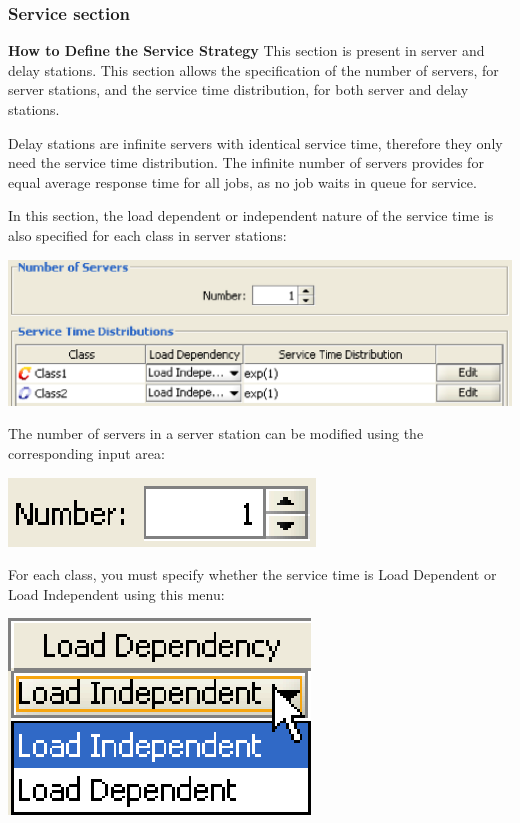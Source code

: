 \subsubsection{Service section}
\label{sec:ServiceSection}
\textbf{How to Define the Service Strategy}
This section is present in server and delay stations. 
This section allows the specification of the number of servers, for server stations, and the service time distribution, for both server and delay stations. 

Delay stations are infinite servers with identical service time, therefore they only need the service time distribution. The infinite number of servers provides for equal average response time for all jobs, as no job waits in queue for service. 

In this section, the load dependent or independent nature of the service time is also specified for each class in server stations:
\begin{center}
\includegraphics[scale=.5]{img/jsim/service_section1.eps}
\end{center}
The number of servers in a server station can be modified using the corresponding input area:
\begin{center}
\includegraphics[scale=.5]{img/jsim/num_servers.eps}
\end{center}
For each class, you must specify whether the service time is Load Dependent or Load Independent using this menu:
\begin{center}
\includegraphics[scale=.5]{img/jsim/load.eps}
\end{center}

